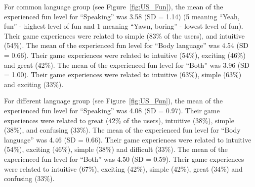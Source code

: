 For common language group (see Figure~\ref{fig:US_Fun}), the mean of the experienced fun level for ``Speaking'' was 3.58 (SD = 1.14) (5 meaning ``Yeah, fun'' - highest level of fun and 1 meaning ``Yawn, boring'' - lowest level of fun). Their game experiences were related to simple (83\% of the users), and intuitive (54\%). The mean of the experienced fun level for ``Body language'' was 4.54 (SD = 0.66). Their game experiences were related to intuitive (54\%), exciting (46\%) and great (42\%). The mean of the experienced fun level for ``Both'' was 3.96 (SD = 1.00). Their game experiences were related to intuitive (63\%), simple (63\%) and exciting (33\%). 

For different language group (see Figure~\ref{fig:US_Fun}), the mean of the experienced fun level for ``Speaking'' was 4.08 (SD = 0.97). Their game experiences were related to great (42\% of the users), intuitive (38\%), simple (38\%), and confusing (33\%). The mean of the experienced fun level for ``Body language'' was 4.46 (SD = 0.66). Their game experiences were related to intuitive (54\%), exciting (46\%), simple (38\%) and difficult (33\%). The mean of the experienced fun level for ``Both'' was 4.50 (SD = 0.59). Their game experiences were related to intuitive (67\%), exciting (42\%), simple (42\%), great (34\%) and confusing (33\%).



